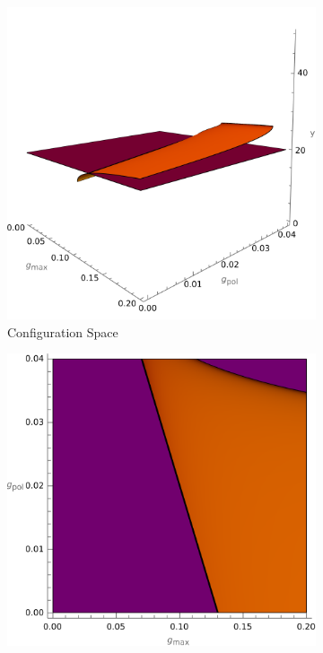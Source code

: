 \documentclass[letterpaper]{article}
\begin{document}
\begin{figure}
        \centering
        \begin{subfigure}[b]{0.3\textwidth}
            \centering
            \includegraphics[width=\textwidth]{worm_saddle.png}
            \caption[]%
            {Configuration Space}    
            \label{fig:mean and std of net14}
        \end{subfigure}
        \begin{subfigure}[b]{0.3\textwidth}  
            \centering 
            \includegraphics[width=\textwidth]{worm_saddle_top.png}

\end{subfigure}
\end{figure}
\end{document}
